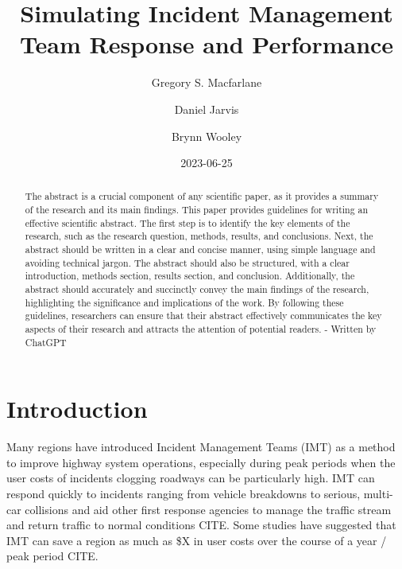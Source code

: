 \documentclass[
  letterpaper,
  DIV=11,
  numbers=noendperiod]{scrreprt}
\title{Simulating Incident Management Team Response and Performance}
\author{Gregory S. Macfarlane \and Daniel Jarvis \and Brynn Wooley}
\date{2023-06-25}
\renewcommand*\contentsname{Table of contents}
\newcommand\contentsname{Table of contents}
\begin{document}
\maketitle
\begin{abstract}
The abstract is a crucial component of any scientific paper, as it
provides a summary of the research and its main findings. This paper
provides guidelines for writing an effective scientific abstract. The
first step is to identify the key elements of the research, such as the
research question, methods, results, and conclusions. Next, the abstract
should be written in a clear and concise manner, using simple language
and avoiding technical jargon. The abstract should also be structured,
with a clear introduction, methods section, results section, and
conclusion. Additionally, the abstract should accurately and succinctly
convey the main findings of the research, highlighting the significance
and implications of the work. By following these guidelines, researchers
can ensure that their abstract effectively communicates the key aspects
of their research and attracts the attention of potential readers. -
Written by ChatGPT
\end{abstract}
\ifdefined\Shaded\renewenvironment{Shaded}{\begin{tcolorbox}[interior hidden, borderline west={3pt}{0pt}{shadecolor}, breakable, enhanced, boxrule=0pt, frame hidden, sharp corners]}{\end{tcolorbox}}\fi

\renewcommand*\contentsname{Table of contents}
{
\hypersetup{linkcolor=}
\setcounter{tocdepth}{2}
\tableofcontents
}

\hypertarget{introduction}{%
\chapter{Introduction}\label{introduction}}

Many regions have introduced Incident Management Teams (IMT) as a method
to improve highway system operations, especially during peak periods
when the user costs of incidents clogging roadways can be particularly
high. IMT can respond quickly to incidents ranging from vehicle
breakdowns to serious, multi-car collisions and aid other first response
agencies to manage the traffic stream and return traffic to normal
conditions CITE. Some studies have suggested that IMT can save a region
as much as \$X in user costs over the course of a year / peak period
CITE.
\end{document}
